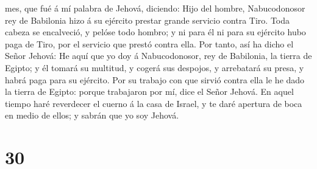 mes, que fué á mí palabra de Jehová, diciendo:  Hijo del
hombre, Nabucodonosor rey de Babilonia hizo á su ejército prestar grande
servicio contra Tiro. Toda cabeza se encalveció, y pelóse todo hombro; y
ni para él ni para su ejército hubo paga de Tiro, por el servicio que
prestó contra ella.  Por tanto, así ha dicho el Señor
Jehová: He aquí que yo doy á Nabucodonosor, rey de Babilonia, la tierra
de Egipto; y él tomará su multitud, y cogerá sus despojos, y arrebatará
su presa, y habrá paga para su ejército.  Por su trabajo
con que sirvió contra ella le he dado la tierra de Egipto: porque
trabajaron por mí, dice el Señor Jehová.  En aquel tiempo
haré reverdecer el cuerno á la casa de Israel, y te daré apertura de
boca en medio de ellos; y sabrán que yo soy Jehová.

\hypertarget{section-29}{%
\section{30}\label{section-29}}

